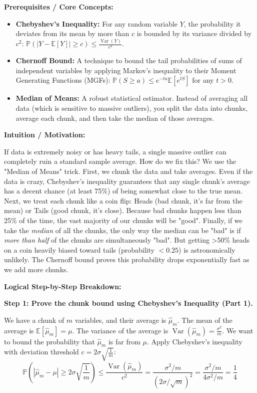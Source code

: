\begin{solution}
\textbf{Prerequisites / Core Concepts:}
\begin{itemize}
    \item \textbf{Chebyshev's Inequality:} For any random variable $Y$, the probability it deviates from its mean by more than $c$ is bounded by its variance divided by $c^2$: $\mathbb{P}(|Y - \mathbb{E}[Y]| \geq c) \leq \frac{\operatorname{Var}(Y)}{c^2}$.
    \item \textbf{Chernoff Bound:} A technique to bound the tail probabilities of sums of independent variables by applying Markov's inequality to their Moment Generating Functions (MGFs): $\mathbb{P}(S \geq a) \leq e^{-ta} \mathbb{E}[e^{tS}]$ for any $t > 0$.
    \item \textbf{Median of Means:} A robust statistical estimator. Instead of averaging all data (which is sensitive to massive outliers), you split the data into chunks, average each chunk, and then take the median of those averages.
\end{itemize}

\textbf{Intuition / Motivation:}

If data is extremely noisy or has heavy tails, a single massive outlier can completely ruin a standard sample average. How do we fix this? We use the "Median of Means" trick. 
First, we chunk the data and take averages. Even if the data is crazy, Chebyshev's inequality guarantees that any single chunk's average has a decent chance (at least 75\%) of being somewhat close to the true mean. 
Next, we treat each chunk like a coin flip: Heads (bad chunk, it's far from the mean) or Tails (good chunk, it's close). Because bad chunks happen less than 25\% of the time, the vast majority of our chunks will be "good". 
Finally, if we take the \textit{median} of all the chunks, the only way the median can be "bad" is if \textit{more than half} of the chunks are simultaneously "bad". But getting >50\% heads on a coin heavily biased toward tails (probability $< 0.25$) is astronomically unlikely. The Chernoff bound proves this probability drops exponentially fast as we add more chunks.

\textbf{Logical Step-by-Step Breakdown:}

\textbf{Step 1: Prove the chunk bound using Chebyshev's Inequality (Part 1).}

We have a chunk of $m$ variables, and their average is $\hat{\mu}_m$.
The mean of the average is $\mathbb{E}[\hat{\mu}_m] = \mu$.
The variance of the average is $\operatorname{Var}(\hat{\mu}_m) = \frac{\sigma^2}{m}$.
We want to bound the probability that $\hat{\mu}_m$ is far from $\mu$. Apply Chebyshev's inequality with deviation threshold $c = 2\sigma \sqrt{\frac{1}{m}}$:
\[ \mathbb{P} \left( |\hat{\mu}_m - \mu| \geq 2\sigma \sqrt{\frac{1}{m}} \right) \leq \frac{\operatorname{Var}(\hat{\mu}_m)}{c^2} = \frac{\sigma^2 / m}{(2\sigma / \sqrt{m})^2} = \frac{\sigma^2 / m}{4\sigma^2 / m} = \frac{1}{4} \]


\end{solution}
